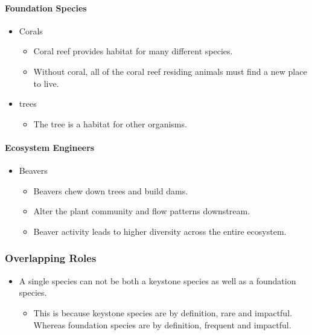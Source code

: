 \documentclass[12pt]{article}
\begin{document}
\paragraph{Foundation Species}
\begin{itemize}
    \item Corals
          \begin{itemize}
              \item Coral reef provides habitat for many different species.
              \item Without coral, all of the coral reef residing animals must find a new place to live.
          \end{itemize}
    \item trees
          \begin{itemize}
              \item The tree is a habitat for other organisms.
          \end{itemize}
\end{itemize}

\paragraph{Ecosystem Engineers}
\begin{itemize}
    \item Beavers
          \begin{itemize}
              \item Beavers chew down trees and build dams.
              \item Alter the plant community and flow patterns downstream.
              \item Beaver activity leads to higher diversity across the entire ecosystem.
          \end{itemize}
\end{itemize}

\subsubsection{Overlapping Roles}
\begin{itemize}
    \item A single species can not be both a keystone species as well as a foundation species.
          \begin{itemize}
              \item This is because keystone species are by definition, rare and impactful. Whereas foundation species are by definition, frequent and impactful.
          \end{itemize}
\end{itemize}
\end{document}
